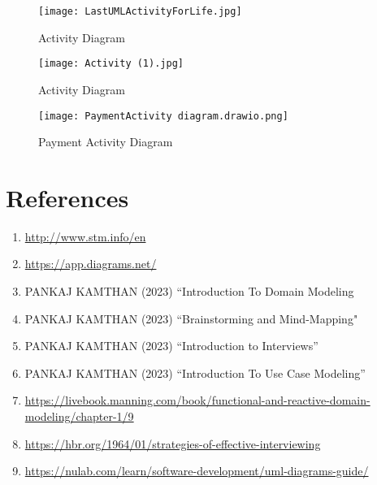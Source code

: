 \documentclass[a4paper,12pt]{report}
\begin{document}
 \begin{figure}[h!]
   \centering
    \texttt{[image: LastUMLActivityForLife.jpg]}
   \caption{Activity Diagram}
 \end{figure}

   \begin{figure}[h!]
   \centering
    \texttt{[image: Activity (1).jpg]}
   \caption{Activity Diagram}
 \end{figure}
 
 \begin{figure}[h!]
   \centering
    \texttt{[image: PaymentActivity diagram.drawio.png]}
   \caption{Payment Activity Diagram}
 \end{figure}
\chapter{References}
\begin{enumerate}
  \item \url{http://www.stm.info/en}
   \item \url{https://app.diagrams.net/}
  \item PANKAJ KAMTHAN (2023) “Introduction To Domain Modeling
   \item PANKAJ KAMTHAN (2023) “Brainstorming and Mind-Mapping"
   \item PANKAJ KAMTHAN (2023) “Introduction to Interviews”
   \item PANKAJ KAMTHAN (2023) “Introduction To Use Case Modeling”
   
   \item \url{https://livebook.manning.com/book/functional-and-reactive-domain-modeling/chapter-1/9}
   \item \url{https://hbr.org/1964/01/strategies-of-effective-interviewing}
   \item \url{https://nulab.com/learn/software-development/uml-diagrams-guide/}
   
   
   \cite{sabou2018verifying}
   \cite{6164775}
   \cite{wood1997semi}
   \cite{mackinnon2003designing}

   
\end{enumerate}
\end{document}
